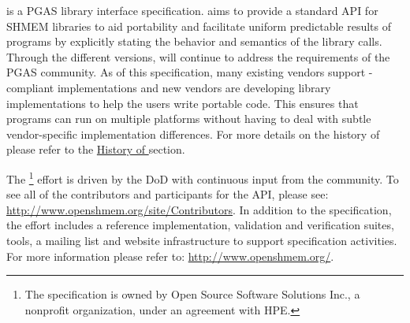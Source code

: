 \openshmem is a \ac{PGAS} library interface specification. \openshmem aims to
provide a standard \ac{API} for SHMEM libraries to aid portability and
facilitate uniform predictable results of \openshmem programs by explicitly
stating the behavior and semantics of the \openshmem library calls. Through the
different versions, \openshmem will continue to address the requirements of the
\ac{PGAS} community.  As of this specification, many existing vendors support
\openshmem-compliant implementations and new vendors are developing
\openshmem library implementations to help the users write portable \openshmem
code. This ensures that programs can run on multiple platforms without having to
deal with subtle vendor-specific implementation differences. For more details on
the history of \openshmem please refer to the
\hyperref[sec:openshmem_history]{History of \openshmem} section.

The \openshmem\footnote{The \openshmem specification is owned by Open Source
Software Solutions Inc., a nonprofit organization, under an agreement with
\ac{HPE}.} effort is driven by the \ac{DoD} with continuous input from the \openshmem community.
To see all of the contributors and participants for the \openshmem \ac{API},
please see: \url{http://www.openshmem.org/site/Contributors}. In addition to the
specification, the effort includes a reference \openshmem
implementation, validation and verification suites, tools, a mailing list and
website infrastructure to support specification activities. For more information
please refer to: \url{http://www.openshmem.org/}.
